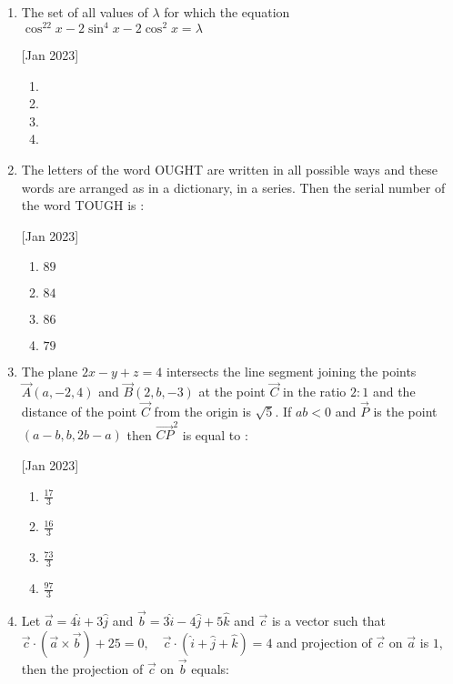 \documentclass[journal,12pt,twocolumn]{IEEEtran}
\theoremstyle{remark}
\begin{document}
\begin{enumerate}
    \item The set of all values of $\lambda$ for which the equation $\cos^22x-2\sin^4x-2\cos^2x=\lambda$
    
    \hfill[Jan 2023]
        \begin{enumerate}
            \item {}
            \item {}
            \item {}
            \item {}
        \end{enumerate}

    \item The letters of the word OUGHT are written in all possible ways and these words are arranged as in a dictionary, in a series. Then the serial number of the word TOUGH is :
    
    \hfill[Jan 2023]
        \begin{enumerate}
            \item $89$
            \item $84$
            \item $86$
            \item $79$
        \end{enumerate}

    \item The plane $2x-y+z=4$ intersects the line segment joining the points $\vec{A}(a, -2, 4)$ and $\vec{B}(2, b, -3)$ at the point $\vec{C}$ in the ratio $2:1$ and the distance of the point $\vec{C}$ from the origin is $\sqrt{5}$. If $ab<0$ and $\vec{P}$ is the point $(a-b,b,2b-a)$ then $\vec{CP}^2$ is equal to :
    
    \hfill[Jan 2023]
        \begin{enumerate}
            \item $\frac{17}{3}$
            \item $\frac{16}{3}$
            \item $\frac{73}{3}$
            \item $\frac{97}{3}$
        \end{enumerate}

    \item Let $\vec{a} = 4\hat{i} + 3\hat{j}$ and $\vec{b} = 3\hat{i} - 4\hat{j} + 5\hat{k}$ and $\vec{c}$ is a vector such that $\vec{c} \cdot (\vec{a} \times \vec{b}) + 25 = 0, \quad \vec{c} \cdot (\hat{i} + \hat{j} + \hat{k}) = 4$ and projection of $\vec{c}$ on $\vec{a}$ is $1$, then the projection of $\vec{c}$ on $\vec{b}$ equals:
    

\end{enumerate}
\end{document}
